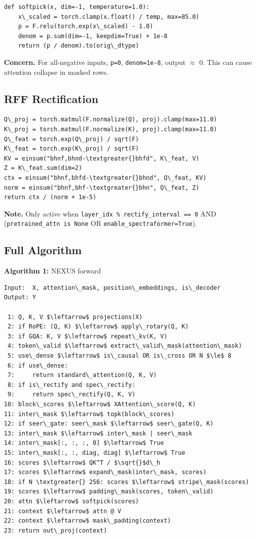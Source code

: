 \begin{lstlisting}
def softpick(x, dim=-1, temperature=1.0):
    x\_scaled = torch.clamp(x.float() / temp, max=85.0)
    p = F.relu(torch.exp(x\_scaled) - 1.0)
    denom = p.sum(dim=-1, keepdim=True) + 1e-8
    return (p / denom).to(orig\_dtype)
\end{lstlisting}

\textbf{Concern.} For all-negative inputs, \texttt{p=0}, \texttt{denom=1e-8}, output $\approx$ 0. 
This can cause attention collapse in masked rows.

\subsection{RFF Rectification}

\begin{lstlisting}
Q\_proj = torch.matmul(F.normalize(Q), proj).clamp(max=11.0)
K\_proj = torch.matmul(F.normalize(K), proj).clamp(max=11.0)
Q\_feat = torch.exp(Q\_proj) / sqrt(F)
K\_feat = torch.exp(K\_proj) / sqrt(F)
KV = einsum("bhnf,bhnd-\textgreater{}bhfd", K\_feat, V)
Z = K\_feat.sum(dim=2)
ctx = einsum("bhnf,bhfd-\textgreater{}bhnd", Q\_feat, KV)
norm = einsum("bhnf,bhf-\textgreater{}bhn", Q\_feat, Z)
return ctx / (norm + 1e-5)
\end{lstlisting}

\textbf{Note.} Only active when \texttt{layer\_idx \% rectify\_interval == 0} AND (\texttt{pretrained\_attn is None} OR \texttt{enable\_spectraformer=True}).

\subsection{Full Algorithm}

\textbf{Algorithm 1:} NEXUS forward
\begin{lstlisting}
Input:  X, attention\_mask, position\_embeddings, is\_decoder
Output: Y

 1: Q, K, V $\leftarrow$ projections(X)
 2: if RoPE: (Q, K) $\leftarrow$ apply\_rotary(Q, K)
 3: if GQA: K, V $\leftarrow$ repeat\_kv(K, V)
 4: token\_valid $\leftarrow$ extract\_valid\_mask(attention\_mask)
 5: use\_dense $\leftarrow$ is\_causal OR is\_cross OR N $\le$ 8
 6: if use\_dense:
 7:     return standard\_attention(Q, K, V)
 8: if is\_rectify and spec\_rectify:
 9:     return spec\_rectify(Q, K, V)
10: block\_scores $\leftarrow$ XAttention\_score(Q, K)
11: inter\_mask $\leftarrow$ topk(block\_scores)
12: if seer\_gate: seer\_mask $\leftarrow$ seer\_gate(Q, K)
13: inter\_mask $\leftarrow$ inter\_mask | seer\_mask
14: inter\_mask[:, :, :, 0] $\leftarrow$ True
15: inter\_mask[:, :, diag, diag] $\leftarrow$ True
16: scores $\leftarrow$ QK^T / $\sqrt{}$d\_h
17: scores $\leftarrow$ expand\_mask(inter\_mask, scores)
18: if N \textgreater{} 256: scores $\leftarrow$ stripe\_mask(scores)
19: scores $\leftarrow$ padding\_mask(scores, token\_valid)
20: attn $\leftarrow$ softpick(scores)
21: context $\leftarrow$ attn @ V
22: context $\leftarrow$ mask\_padding(context)
23: return out\_proj(context)
\end{lstlisting}

